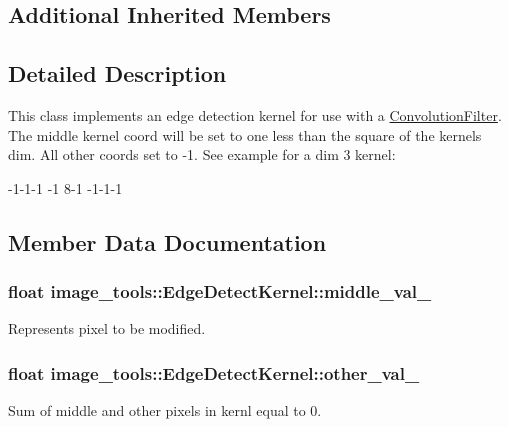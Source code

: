 \subsection*{Additional Inherited Members}


\subsection{Detailed Description}
This class implements an edge detection kernel for use with a \hyperlink{classimage__tools_1_1ConvolutionFilter}{Convolution\+Filter}. The middle kernel coord will be set to one less than the square of the kernel\textquotesingle{}s dim. All other coords set to -\/1. See example for a dim 3 kernel\+: 

-\/1-\/1-\/1 -\/1 8-\/1 -\/1-\/1-\/1 

\subsection{Member Data Documentation}
\subsubsection[{\texorpdfstring{middle\+\_\+val\+\_\+}{middle_val_}}]{\setlength{\rightskip}{0pt plus 5cm}float image\+\_\+tools\+::\+Edge\+Detect\+Kernel\+::middle\+\_\+val\+\_\+\hspace{0.3cm}{\ttfamily [private]}}\hypertarget{classimage__tools_1_1EdgeDetectKernel_ab10b3421f714693466587355c3edff1d}{}\label{classimage__tools_1_1EdgeDetectKernel_ab10b3421f714693466587355c3edff1d}
Represents pixel to be modified. 
\subsubsection[{\texorpdfstring{other\+\_\+val\+\_\+}{other_val_}}]{\setlength{\rightskip}{0pt plus 5cm}float image\+\_\+tools\+::\+Edge\+Detect\+Kernel\+::other\+\_\+val\+\_\+\hspace{0.3cm}{\ttfamily [private]}}\hypertarget{classimage__tools_1_1EdgeDetectKernel_a7022ded313828624cfd89fa4d2a231ce}{}\label{classimage__tools_1_1EdgeDetectKernel_a7022ded313828624cfd89fa4d2a231ce}
Sum of middle and other pixels in kernl equal to 0. 

